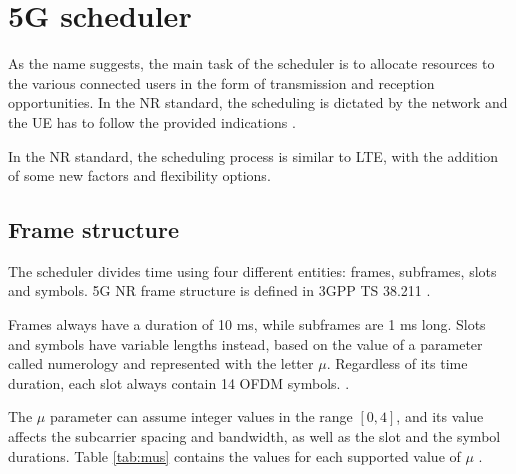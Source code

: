 \section{5G scheduler}
As the name suggests, the main task of the scheduler is to allocate resources to the various connected users in the form of transmission and reception opportunities. In the \ac{NR} standard, the scheduling is dictated by the network and the \ac{UE} has to follow the provided indications \cite{5g-sched-sharetechnote}.

In the \ac{NR} standard, the scheduling process is similar to LTE, with the addition of some new factors and flexibility options. 

\subsection{Frame structure}
The scheduler divides time using four different entities: frames, subframes, slots and symbols. 5G \ac{NR} frame structure is defined in \ac{3GPP} TS 38.211 \cite{3gpp-ts-38.211}. 

Frames always have a duration of 10 ms, while subframes are 1 ms long. Slots and symbols have variable lengths instead, based on the value of a parameter called numerology and represented with the letter $\mu$. Regardless of its time duration, each slot always contain 14 \ac{OFDM} symbols. \cite{gaussianwaves-frame}. 

The $\mu$ parameter can assume integer values in the range $\left[0, 4\right]$, and its value affects the subcarrier spacing and bandwidth, as well as the slot and the symbol durations. Table \ref{tab:mus} contains the values for each supported value of $\mu$ \cite{gaussianwaves-frame}.

